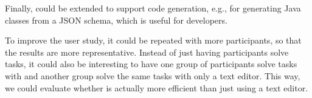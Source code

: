 Finally, \toolname{} could be extended to support code generation, e.g., for generating
Java classes from a JSON schema, which is useful for developers.

To improve the user study, it could be repeated with more participants,
so that the results are more representative.
Instead of just having participants solve tasks, it could also be interesting to
have one group of participants solve tasks with \toolname{} and another group solve
the same tasks with only a text editor.
This way, we could evaluate whether \toolname{} is actually more efficient than
just using a text editor.


